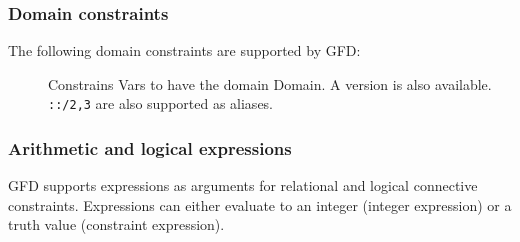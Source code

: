 \subsubsection{Domain constraints}

The following domain constraints are supported by GFD:

\begin{description}
\item[]
Constrains Vars to have the domain Domain. A  version is also available.
\verb'::/2,3' are also supported as aliases.

\end{description}

  
\subsubsection{Arithmetic and logical expressions}

GFD supports expressions as arguments for relational and logical connective
constraints. Expressions can either evaluate to an integer (integer 
expression) or a truth value (constraint expression).

